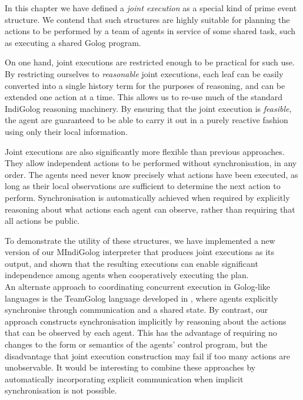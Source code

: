 In this chapter we have defined a \emph{joint execution} as a special
kind of prime event structure. We contend that such structures are
highly suitable for planning the actions to be performed by a team
of agents in service of some shared task, such as executing a shared
Golog program.

On one hand, joint executions are restricted enough to be practical
for such use. By restricting ourselves to \emph{reasonable} joint
executions, each leaf can be easily converted into a single history
term for the purposes of reasoning, and can be extended one action
at a time. This allows us to re-use much of the standard IndiGolog
reasoning machinery. By ensuring that the joint execution is \emph{feasible},
the agent are guaranteed to be able to carry it out in a purely reactive
fashion using only their local information.

Joint executions are also significantly more flexible than previous
approaches. They allow independent actions to be performed without
synchronisation, in any order. The agents need never know precisely
what actions have been executed, as long as their local observations
are sufficient to determine the next action to perform. Synchronisation
is automatically achieved when required by explicitly reasoning about
what actions each agent can observe, rather than requiring that all
actions be public.

To demonstrate the utility of these structures, we have implemented
a new version of our MIndiGolog interpreter that produces joint executions
as its output, and shown that the resulting executions can enable
significant independence among agents when cooperatively executing
the plan.\\


An alternate approach to coordinating concurrent execution in Golog-like
languages is the TeamGolog language developed in \citep{farinelli07team_golog},
where agents explicitly synchronise through communication and a shared
state. By contrast, our approach constructs synchronisation implicitly
by reasoning about the actions that can be observed by each agent.
This has the advantage of requiring no changes to the form or semantics
of the agents' control program, but the disadvantage that joint execution
construction may fail if too many actions are unobservable. It would
be interesting to combine these approaches by automatically incorporating
explicit communication when implicit synchronisation is not possible.

